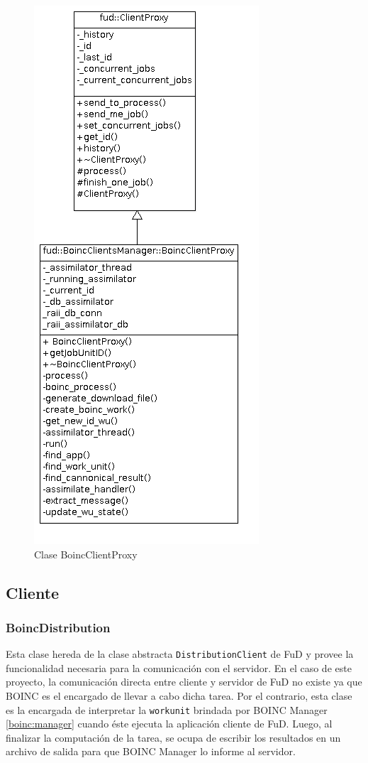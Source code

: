 \begin{figure}[H]
	\begin{center}
  		\includegraphics[scale=0.65]{images/BoincClientProxy.png}
		\caption{Clase BoincClientProxy}
		\label{fig:BoincClientProxy}
	\end{center}
\end{figure} 


\subsection{Cliente}

\subsubsection{BoincDistribution}
\label{seccion:diseno:BoincDistribution}
Esta clase hereda de la clase abstracta \texttt{DistributionClient} de FuD y provee la funcionalidad necesaria para la comunicación con el servidor. En el caso de este proyecto, la comunicación directa entre cliente y servidor de FuD no existe ya que BOINC es el encargado de llevar a cabo dicha tarea. Por el contrario, esta clase es la encargada de interpretar la \texttt{workunit} brindada por BOINC Manager \ref{boinc:manager} cuando éste ejecuta la aplicación cliente de FuD. Luego, al finalizar la computación de la tarea, se ocupa de escribir los resultados en un archivo de salida para que BOINC Manager lo informe al servidor.

